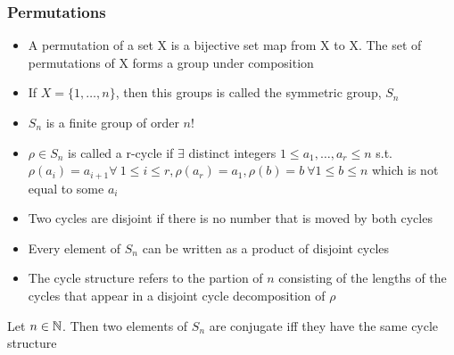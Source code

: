 \documentclass[../Odyssey_Project.tex]{subfiles}
\begin{document}
\subsubsection*{Permutations}
\begin{itemize}
    \item A permutation of a set X is a bijective set map from X to X. The set of permutations of X forms a group under composition
    \item If \(X = \{1,\dots , n\}\), then this groups is called the symmetric group, \(S_n\)
    \item \(S_n\) is a finite group of order \(n!\)
    \item \(\rho \in S_n\) is called a r-cycle if \(\exists\) distinct integers \(1 \leq a_1,\dots, a_r \leq n\) s.t. \(\rho(a_i) = a_{i+1} \forall \ 1 \leq i \le r, \rho(a_r) = a_1, \rho(b) = b \ \forall 1 \leq b \leq n\) which is not equal to some \(a_i\)
    \item Two cycles are disjoint if there is no number that is moved by both cycles
    \item Every element of \(S_n\) can be written as a product of disjoint cycles
    \item The cycle structure refers to the partion of \(n\) consisting of the lengths of the cycles that appear in a disjoint cycle decomposition of \(\rho\)
\end{itemize}
\begin{proposition}
\label{prop:1.10}
Let \(n \in \mathbb{N}\). Then two elements of \(S_n\) are conjugate iff they have the same cycle structure
\end{proposition}
\end{document}
